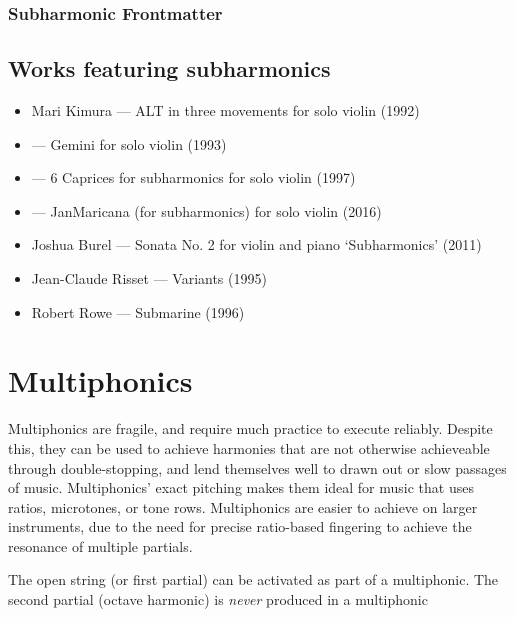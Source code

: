 

\subsubsection{Subharmonic Frontmatter}\label{sec:subharmonicFrontmatter}

\subsection{Works featuring subharmonics }\label{sec:subharmonicsLiterature}

\begin{itemize}
    \item Mari Kimura --- ALT in three movements for solo violin (1992)
    \item --- Gemini for solo violin (1993)
    \item --- 6 Caprices for subharmonics for solo violin (1997) 
    \item --- JanMaricana (for subharmonics) for solo violin (2016)
    \item Joshua Burel --- Sonata No. 2 for violin and piano `Subharmonics' (2011)
    \item Jean-Claude Risset --- Variants (1995)
    \item Robert Rowe --- Submarine (1996)
\end{itemize}

\section{Multiphonics}\label{sec:multiphonics}

Multiphonics are fragile, and require much practice to execute reliably.
Despite this, they can be used to achieve harmonies that are not otherwise achieveable through double-stopping, and lend themselves well to drawn out or slow passages of music. 
Multiphonics' exact pitching makes them ideal for music that uses ratios, microtones, or tone rows. 
Multiphonics are easier to achieve on larger instruments, due to the need for precise ratio-based fingering to achieve the resonance of multiple partials.

The open string (or first partial) can be activated as part of a multiphonic.\autocite[161]{welbanksFoundationsModernCello}
The second partial (octave harmonic) is \emph{never} produced in a multiphonic


